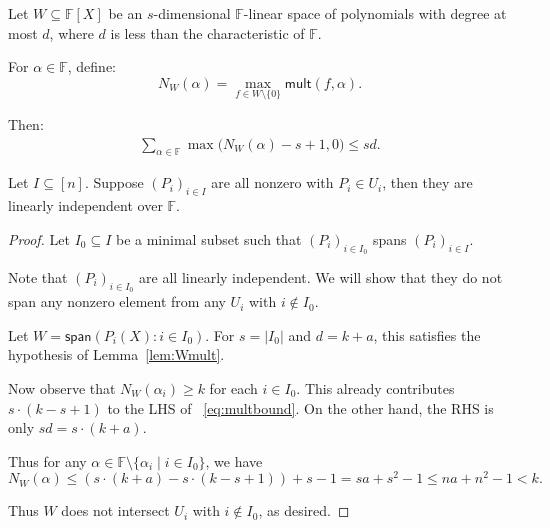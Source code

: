 \documentclass[10pt,a4paper]{amsart}
\newcommand{\F}{\mathbb{F}}
\newcommand{\mult}{\mathsf{mult}}
\begin{document}
\begin{lemma}\label{lem:Wmult}
Let $W \subseteq\F[X]$ be an $s$-dimensional $\F$-linear space of polynomials with degree at most $d$, where $d$ is less than the characteristic of $\F$.
 
 For $\alpha \in \F$, define:
 $$ N_W(\alpha) = \max_{f \in W\setminus \{0\}} \mult(f, \alpha).$$

 Then:
 \begin{align}
  \label{eq:multbound}
  \sum_{\alpha \in \F } \max \bigg( N_W(\alpha) - s + 1 , 0 \bigg)  \leq  s d.
 \end{align}
\end{lemma}

\begin{lemma}\label{lem:lin-indep}
 Let $I \subseteq [n]$.
 Suppose $(P_i )_{i \in I}$ are all nonzero with $P_i \in U_i$, then they are linearly independent over $\F$.
\end{lemma}

\begin{proof}
Let $I_0 \subseteq I$ be a minimal 
subset such that $(P_i)_{i \in I_0}$ spans
$(P_i)_{i \in I}$. 

Note that $(P_i)_{i \in I_0}$ are all linearly independent.
We will show that they do not span any nonzero element
from any $U_i$ with $i \not\in I_0$.

Let $W = \mathsf{span}( P_i(X) : i \in I_0 )$.
For $s = |I_0|$ and $d = k + a$, this satisfies the hypothesis of Lemma~\ref{lem:Wmult}.

Now observe that $N_W(\alpha_i) \geq k$ for each $i \in I_0$.
This already contributes $s \cdot (k - s + 1)$ to the LHS of 
~\eqref{eq:multbound}.
On the other hand, the RHS is only $sd = s \cdot (k + a)$.

Thus for any $\alpha \in \F \setminus \{ \alpha_i \mid i \in I_0 \}$, we have
$$N_W(\alpha) \leq  \left( s \cdot (k+a) - s \cdot (k-s+1) \right) + s - 1 = sa + s^2 - 1 \leq na  + n^2 -1 < k.$$

Thus $W$ does not intersect $U_i$ with $i \not\in I_0$, as desired.
\end{proof}
\end{document}
